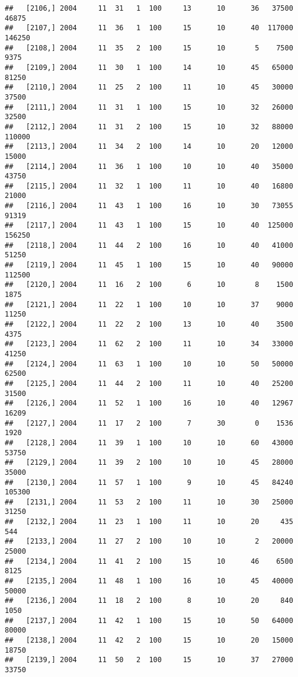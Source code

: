 \documentclass{article}\usepackage[]{graphicx}\usepackage[]{color}
\makeatletter
\newenvironment{kframe}{%
 \def\at@end@of@kframe{}%
 \ifinner\ifhmode%
  \def\at@end@of@kframe{\end{minipage}}%
  \begin{minipage}{\columnwidth}%
 \fi\fi%
 \def\FrameCommand##1{\hskip\@totalleftmargin \hskip-\fboxsep
 \colorbox{shadecolor}{##1}\hskip-\fboxsep
     \hskip-\linewidth \hskip-\@totalleftmargin \hskip\columnwidth}%
 \MakeFramed {\advance\hsize-\width
   \@totalleftmargin\z@ \linewidth\hsize
   \@setminipage}}%
 {\par\unskip\endMakeFramed%
 \at@end@of@kframe}
\newenvironment{knitrout}{}{} %
\makeatother
\begin{document}
\begin{knitrout}
\begin{kframe}
\begin{verbatim}
##   [2106,] 2004     11  31   1  100     13      10      36   37500   46875
##   [2107,] 2004     11  36   1  100     15      10      40  117000  146250
##   [2108,] 2004     11  35   2  100     15      10       5    7500    9375
##   [2109,] 2004     11  30   1  100     14      10      45   65000   81250
##   [2110,] 2004     11  25   2  100     11      10      45   30000   37500
##   [2111,] 2004     11  31   1  100     15      10      32   26000   32500
##   [2112,] 2004     11  31   2  100     15      10      32   88000  110000
##   [2113,] 2004     11  34   2  100     14      10      20   12000   15000
##   [2114,] 2004     11  36   1  100     10      10      40   35000   43750
##   [2115,] 2004     11  32   1  100     11      10      40   16800   21000
##   [2116,] 2004     11  43   1  100     16      10      30   73055   91319
##   [2117,] 2004     11  43   1  100     15      10      40  125000  156250
##   [2118,] 2004     11  44   2  100     16      10      40   41000   51250
##   [2119,] 2004     11  45   1  100     15      10      40   90000  112500
##   [2120,] 2004     11  16   2  100      6      10       8    1500    1875
##   [2121,] 2004     11  22   1  100     10      10      37    9000   11250
##   [2122,] 2004     11  22   2  100     13      10      40    3500    4375
##   [2123,] 2004     11  62   2  100     11      10      34   33000   41250
##   [2124,] 2004     11  63   1  100     10      10      50   50000   62500
##   [2125,] 2004     11  44   2  100     11      10      40   25200   31500
##   [2126,] 2004     11  52   1  100     16      10      40   12967   16209
##   [2127,] 2004     11  17   2  100      7      30       0    1536    1920
##   [2128,] 2004     11  39   1  100     10      10      60   43000   53750
##   [2129,] 2004     11  39   2  100     10      10      45   28000   35000
##   [2130,] 2004     11  57   1  100      9      10      45   84240  105300
##   [2131,] 2004     11  53   2  100     11      10      30   25000   31250
##   [2132,] 2004     11  23   1  100     11      10      20     435     544
##   [2133,] 2004     11  27   2  100     10      10       2   20000   25000
##   [2134,] 2004     11  41   2  100     15      10      46    6500    8125
##   [2135,] 2004     11  48   1  100     16      10      45   40000   50000
##   [2136,] 2004     11  18   2  100      8      10      20     840    1050
##   [2137,] 2004     11  42   1  100     15      10      50   64000   80000
##   [2138,] 2004     11  42   2  100     15      10      20   15000   18750
##   [2139,] 2004     11  50   2  100     15      10      37   27000   33750

\end{verbatim}
\end{kframe}
\end{knitrout}
\end{document}
